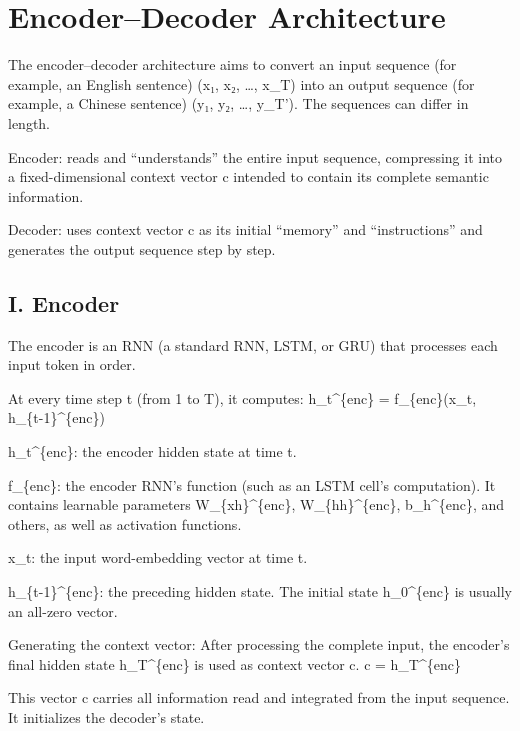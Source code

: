 \setcounter{section}{2}

\hypertarget{encoderdecoder-architecture}{%
\section{Encoder--Decoder Architecture}\label{encoderdecoder-architecture}}

The encoder--decoder architecture aims to convert an input sequence (for example, an English sentence) (x₁, x₂, \ldots, x\_T) into an output sequence (for example, a Chinese sentence) (y₁, y₂, \ldots, y\_T'). The sequences can differ in length.

Encoder: reads and ``understands'' the entire input sequence, compressing it into a fixed-dimensional context vector c intended to contain its complete semantic information.

Decoder: uses context vector c as its initial ``memory'' and ``instructions'' and generates the output sequence step by step.

\hypertarget{i.-encoder}{%
\subsection{I. Encoder}\label{i.-encoder}}

The encoder is an RNN (a standard RNN, LSTM, or GRU) that processes each input token in order.

At every time step t (from 1 to T), it computes:
h\_t\^{}\{enc\} = f\_\{enc\}(x\_t, h\_\{t-1\}\^{}\{enc\})

h\_t\^{}\{enc\}: the encoder hidden state at time t.

f\_\{enc\}: the encoder RNN's function (such as an LSTM cell's computation). It contains learnable parameters W\_\{xh\}\^{}\{enc\}, W\_\{hh\}\^{}\{enc\}, b\_h\^{}\{enc\}, and others, as well as activation functions.

x\_t: the input word-embedding vector at time t.

h\_\{t-1\}\^{}\{enc\}: the preceding hidden state. The initial state h\_0\^{}\{enc\} is usually an all-zero vector.

Generating the context vector:
After processing the complete input, the encoder's final hidden state h\_T\^{}\{enc\} is used as context vector c.
c = h\_T\^{}\{enc\}

This vector c carries all information read and integrated from the input sequence. It initializes the decoder's state.


